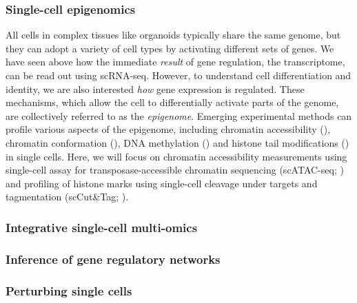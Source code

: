 \subsubsection{Single-cell epigenomics}

All cells in complex tissues like organoids typically share the same genome, but they can adopt a variety of cell types by activating different sets of genes. We have seen above how the immediate \textit{result} of gene regulation, the transcriptome, can be read out using scRNA-seq. However, to understand cell differentiation and identity, we are also interested \textit{how} gene expression is regulated. These mechanisms, which allow the cell to differentially activate parts of the genome, are collectively referred to as the \textit{epigenome}. Emerging experimental methods can profile various aspects of the epigenome, including chromatin accessibility (\cite{buenrostro_single-cell_2015,cusanovich_multiplex_2015}), chromatin conformation (\cite{ramani_massively_2017,stevens_3d_2017}), DNA methylation (\cite{smallwood_single-cell_2014}) and histone tail modifications (\cite{kaya-okur_cuttag_2019,bartosovic_single-cell_2021,ku_single-cell_2019,hainer_profiling_2019}) in single cells. Here, we will focus on chromatin accessibility measurements using single-cell assay for transposase-accessible chromatin sequencing (scATAC-seq; \cite{buenrostro_single-cell_2015}) and profiling of histone marks using single-cell cleavage under targets and tagmentation (scCut\&Tag; \cite{kaya-okur_cuttag_2019}).






\subsubsection{Integrative single-cell multi-omics}


\subsubsection{Inference of gene regulatory networks}


\subsubsection{Perturbing single cells}




